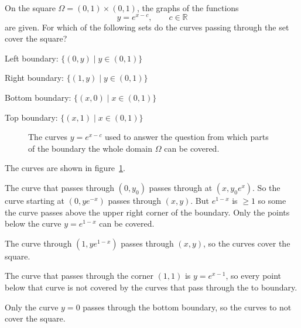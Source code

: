 On the square $\Omega = (0,1)\times (0,1)$, the graphs of the functions
\[
y = e^{x-c},\qquad c \in\mathbb{R}
\]
are given.
For which of the following sets do the curves passing through the set
cover the square?
\begin{teilaufgaben}
\item Left boundary: $\{(0,y)\mid y\in (0,1)\}$
\item Right boundary: $\{(1,y)\mid y\in (0,1)\}$
\item Bottom boundary: $\{(x,0)\mid x\in (0,1)\}$
\item Top boundary: $\{(x,1)\mid x\in (0,1)\}$
\end{teilaufgaben}

\begin{loesung}
\begin{figure}
\centering
{}
\caption{The curves $y=e^{x-c}$ used to answer the question
from which parts of the boundary the whole domain $\Omega$
can be covered.
\label{30000031:fig}}
\end{figure}
The curves are shown in figure~\ref{30000031:fig}.
\begin{teilaufgaben}
\item
The curve that passes through $(0,y_0)$ passes through
at $(x,y_0e^x)$.
So the curve starting at $(0,ye^{-x})$ passes through $(x,y)$.
But $e^{1-x}$ is $\ge 1$ so some the curve passes above
the upper right corner of the boundary.
Only the points below the curve $y=e^{1-x}$ can be covered.
\item
The curve through $(1,ye^{1-x})$ passes through $(x,y)$, so the curves
cover the square.
\item
The curve that passes through the corner $(1,1)$ is $y=e^{x-1}$, so
every point below that curve is not covered by the curves that pass
through the to boundary.
\item
Only the curve $y=0$ passes through the bottom boundary, so the curves
to not cover the square.
\end{teilaufgaben}
\end{loesung}
